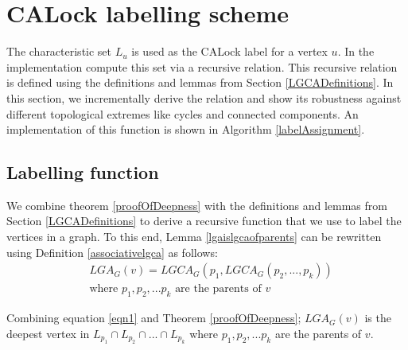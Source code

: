 \section{CALock labelling scheme} \label{sec:labellingScheme}
The characteristic set $L_u$ is used as the CALock label for a vertex $u$.  
In the implementation compute this set via a recursive relation. 
This recursive relation is defined using the definitions and lemmas from Section \ref{LGCADefinitions}. 
In this section, we incrementally derive the relation and show its robustness against different topological extremes like cycles and connected components.  
An implementation of this function is shown in Algorithm \ref{labelAssignment}.


\subsection{Labelling function} \label{sec:recursivelabellingfunction}

We combine theorem \ref{proofOfDeepness} with the definitions and lemmas from Section \ref{LGCADefinitions} to derive a recursive function that we use to label the vertices in a graph. To this end,
Lemma \ref{lgaislgcaofparents} can be rewritten using Definition \ref{associativelgca} as follows:
\begin{equation}\label{eqn1}
\begin{split}
    &{LGA_G(v) = LGCA_G (p_1, LGCA_G (p_2,...,p_k))}
    \\ &\text{where } p_1, p_2, ... p_k \text{ are the parents of } v
\end{split}
\end{equation}


Combining equation \ref{eqn1} and Theorem \ref{proofOfDeepness}; $LGA_G(v)$ is the deepest vertex in $ L_{p_1} \cap L_{p_2} \cap ... \cap L_{p_k}$ where $p_1, p_2, ... p_k$ are the parents of $v$.

